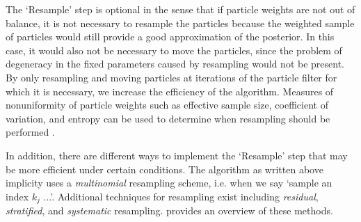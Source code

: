 \documentclass{article}
\begin{document}
The `Resample' step is optional in the sense that if particle weights are not out of balance, it is not necessary to resample the particles because the weighted sample of particles would still provide a good approximation of the posterior. In this case, it would also not be necessary to move the particles, since the problem of degeneracy in the fixed parameters caused by resampling would not be present. By only resampling and moving particles at iterations of the particle filter for which it is necessary, we increase the efficiency of the algorithm. Measures of nonuniformity of particle weights such as effective sample size, coefficient of variation, and entropy can be used to determine when resampling should be performed \citep{Liu:Chen:Wong:reje:1998}. %

In addition, there are different ways to implement the `Resample' step that may be more efficient under certain conditions. The algorithm as written above implicity uses a \emph{multinomial} resampling scheme, i.e. when we say `sample an index $k_j$ ...'. Additional techniques for resampling exist including \emph{residual}, \emph{stratified}, and \emph{systematic} resampling. \citet{Douc:Capp:Moul:comp:2005} provides an overview of these methods. %

\clearpage



\end{document}
